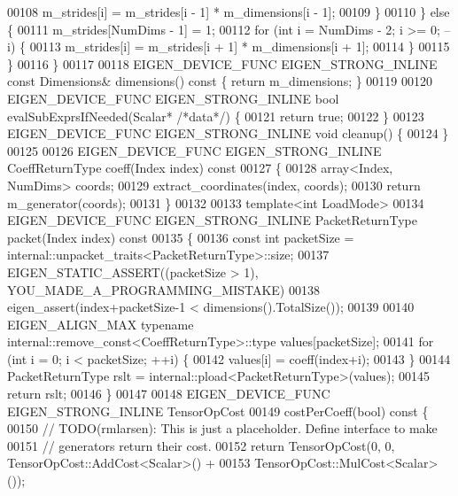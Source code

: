 \begin{DoxyCode}
00108         m\_strides[i] = m\_strides[i - 1] * m\_dimensions[i - 1];
00109       \}
00110     \} \textcolor{keywordflow}{else} \{
00111       m\_strides[NumDims - 1] = 1;
00112       \textcolor{keywordflow}{for} (\textcolor{keywordtype}{int} i = NumDims - 2; i >= 0; --i) \{
00113         m\_strides[i] = m\_strides[i + 1] * m\_dimensions[i + 1];
00114       \}
00115     \}
00116   \}
00117 
00118   EIGEN\_DEVICE\_FUNC EIGEN\_STRONG\_INLINE \textcolor{keyword}{const} Dimensions& dimensions()\textcolor{keyword}{ const }\{ \textcolor{keywordflow}{return} m\_dimensions; \}
00119 
00120   EIGEN\_DEVICE\_FUNC EIGEN\_STRONG\_INLINE \textcolor{keywordtype}{bool} evalSubExprsIfNeeded(Scalar* \textcolor{comment}{/*data*/}) \{
00121     \textcolor{keywordflow}{return} \textcolor{keyword}{true};
00122   \}
00123   EIGEN\_DEVICE\_FUNC EIGEN\_STRONG\_INLINE \textcolor{keywordtype}{void} cleanup() \{
00124   \}
00125 
00126   EIGEN\_DEVICE\_FUNC EIGEN\_STRONG\_INLINE CoeffReturnType coeff(Index index)\textcolor{keyword}{ const}
00127 \textcolor{keyword}{  }\{
00128     array<Index, NumDims> coords;
00129     extract\_coordinates(index, coords);
00130     \textcolor{keywordflow}{return} m\_generator(coords);
00131   \}
00132 
00133   \textcolor{keyword}{template}<\textcolor{keywordtype}{int} LoadMode>
00134   EIGEN\_DEVICE\_FUNC EIGEN\_STRONG\_INLINE PacketReturnType packet(Index index)\textcolor{keyword}{ const}
00135 \textcolor{keyword}{  }\{
00136     \textcolor{keyword}{const} \textcolor{keywordtype}{int} packetSize = internal::unpacket\_traits<PacketReturnType>::size;
00137     EIGEN\_STATIC\_ASSERT((packetSize > 1), YOU\_MADE\_A\_PROGRAMMING\_MISTAKE)
00138     eigen\_assert(index+packetSize-1 < dimensions().TotalSize());
00139 
00140     EIGEN\_ALIGN\_MAX \textcolor{keyword}{typename} internal::remove\_const<CoeffReturnType>::type values[packetSize];
00141     \textcolor{keywordflow}{for} (\textcolor{keywordtype}{int} i = 0; i < packetSize; ++i) \{
00142       values[i] = coeff(index+i);
00143     \}
00144     PacketReturnType rslt = internal::pload<PacketReturnType>(values);
00145     \textcolor{keywordflow}{return} rslt;
00146   \}
00147 
00148   EIGEN\_DEVICE\_FUNC EIGEN\_STRONG\_INLINE TensorOpCost
00149   costPerCoeff(\textcolor{keywordtype}{bool})\textcolor{keyword}{ const }\{
00150     \textcolor{comment}{// TODO(rmlarsen): This is just a placeholder. Define interface to make}
00151     \textcolor{comment}{// generators return their cost.}
00152     \textcolor{keywordflow}{return} TensorOpCost(0, 0, TensorOpCost::AddCost<Scalar>() +
00153                                   TensorOpCost::MulCost<Scalar>());

\end{DoxyCode}
